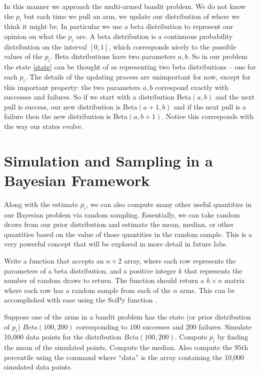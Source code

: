 In this manner we approach the multi-armed bandit problem.  
We do not know the $p_i$ but each time we pull an arm, we update our distribution of where we think it might be.  
In particular we use a beta distribution to represent our opinion on what the $p_i$ are.  
A beta distribution is a continuous probability distribution on the interval $[0,1]$, 
which corresponds nicely to the possible values of the $p_i$.  Beta distributions have two parameters $a,b$.  
So in our problem the state \eqref{state} can be thought of as representing two beta distributions -- one for each $p_i$. 
The details of the updating process are unimportant for now, except 
for this important property: the two parameters $a,b$ correspond exactly with successes and failures.  
So if we start with a distribution Beta$(a,b)$ and the next pull is success, our new distribution is 
Beta$(a+1,b)$ and if the next pull is a failure then the new distribution is Beta$(a,b+1)$.  
Notice this corresponds with the way our states evolve.

\section*{Simulation and Sampling in a Bayesian Framework}
Along with the estimate $\overline{p_i}$, we can also compute many other useful 
quantities in our Bayesian problem via random sampling.  Essentially, we can take 
random draws from our prior distribution and estimate the mean, median, or other 
quantities based on the value of those quantities in the random sample.  
This is a very powerful concept that will be explored in more detail in future labs.

\begin{problem}
Write a function  that accepts an $n\times 2$ array, where each 
row represents the parameters of a beta distribution, and a positive integer $k$ 
that represents the number of random draws to return.  
The function should return a $k\times n$ matrix where each row has a random sample
from each of the $n$ arms.  This can be accomplished with ease using the SciPy function
.
\label{prob:simdata}
\end{problem}

\begin{problem}
Suppose one of the arms in a bandit problem has the state (or prior distribution of $p_i$) 
$Beta(100,200)$ corresponding to $100$ successes and $200$ failures.  
Simulate 10,000 data points for the distribution $Beta(100,200)$.  
Compute $\overline{p_i}$ by finding the mean of the simulated points. 
Compute the median.  Also compute the $95$th percentile using the command 
 where ``data'' is the array 
containing the 10,000 simulated data points.
\end{problem}

